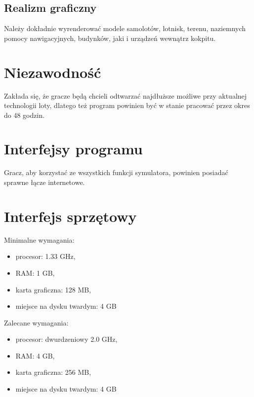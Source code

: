 \documentclass{mwrep}
\begin{document}
\subsection{Realizm graficzny}
Należy dokładnie wyrenderować modele samolotów, lotnisk, terenu, naziemnych pomocy nawigacyjnych, budynków, jaki i urządzeń wewnątrz kokpitu.

\section{Niezawodność}
Zakłada się, że gracze będą chcieli odtwarzać najdłuższe możliwe przy aktualnej technologii loty, dlatego też program powinien być w stanie pracować przez okres do 48 godzin.

\section{Interfejsy programu}
Gracz, aby korzystać ze wszystkich funkcji symulatora, powinien posiadać sprawne łącze internetowe.

\section{Interfejs sprzętowy}
Minimalne wymagania:
\begin{itemize}
\item procesor: 1.33 GHz,
\item RAM: 1 GB,
\item karta graficzna: 128 MB,
\item miejsce na dysku twardym: 4 GB
\end{itemize}
\vspace{1ex}
Zalecane wymagania:
\begin{itemize}
\item procesor: dwurdzeniowy 2.0 GHz,
\item RAM: 4 GB,
\item karta graficzna: 256 MB,
\item miejsce na dysku twardym: 4 GB
\end{itemize}
\end{document}
